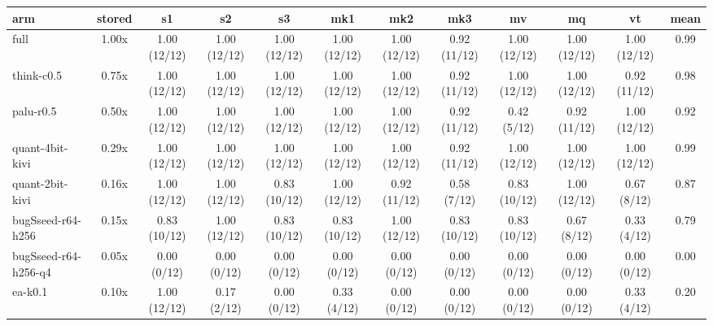 \begin{tabular}{lccccccccccc}
\toprule
arm & stored & s1 & s2 & s3 & mk1 & mk2 & mk3 & mv & mq & vt & mean \\
\midrule
full & 1.00x & 1.00 (12/12) & 1.00 (12/12) & 1.00 (12/12) & 1.00 (12/12) & 1.00 (12/12) & 0.92 (11/12) & 1.00 (12/12) & 1.00 (12/12) & 1.00 (12/12) & 0.99 \\
think-c0.5 & 0.75x & 1.00 (12/12) & 1.00 (12/12) & 1.00 (12/12) & 1.00 (12/12) & 1.00 (12/12) & 0.92 (11/12) & 1.00 (12/12) & 1.00 (12/12) & 0.92 (11/12) & 0.98 \\
palu-r0.5 & 0.50x & 1.00 (12/12) & 1.00 (12/12) & 1.00 (12/12) & 1.00 (12/12) & 1.00 (12/12) & 0.92 (11/12) & 0.42 (5/12) & 0.92 (11/12) & 1.00 (12/12) & 0.92 \\
quant-4bit-kivi & 0.29x & 1.00 (12/12) & 1.00 (12/12) & 1.00 (12/12) & 1.00 (12/12) & 1.00 (12/12) & 0.92 (11/12) & 1.00 (12/12) & 1.00 (12/12) & 1.00 (12/12) & 0.99 \\
quant-2bit-kivi & 0.16x & 1.00 (12/12) & 1.00 (12/12) & 0.83 (10/12) & 1.00 (12/12) & 0.92 (11/12) & 0.58 (7/12) & 0.83 (10/12) & 1.00 (12/12) & 0.67 (8/12) & 0.87 \\
bugSseed-r64-h256 & 0.15x & 0.83 (10/12) & 1.00 (12/12) & 0.83 (10/12) & 0.83 (10/12) & 1.00 (12/12) & 0.83 (10/12) & 0.83 (10/12) & 0.67 (8/12) & 0.33 (4/12) & 0.79 \\
bugSseed-r64-h256-q4 & 0.05x & 0.00 (0/12) & 0.00 (0/12) & 0.00 (0/12) & 0.00 (0/12) & 0.00 (0/12) & 0.00 (0/12) & 0.00 (0/12) & 0.00 (0/12) & 0.00 (0/12) & 0.00 \\
ea-k0.1 & 0.10x & 1.00 (12/12) & 0.17 (2/12) & 0.00 (0/12) & 0.33 (4/12) & 0.00 (0/12) & 0.00 (0/12) & 0.00 (0/12) & 0.00 (0/12) & 0.33 (4/12) & 0.20 \\
\bottomrule
\end{tabular}

